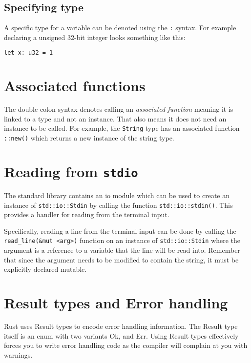 \documentclass[12pt,notitlepage]{article}
\begin{document}
\subsection{Specifying type}

A specific type for a variable can be denoted using the \lstinline{:}
syntax. For example declaring a unsigned 32-bit integer looks something like
this:

\begin{lstlisting}
let x: u32 = 1
\end{lstlisting}



\section{Associated functions}

The double colon syntax denotes calling an \emph{associated function} meaning
it is linked to a type and not an instance. That also means it does not need an
instance to be called. For example, the \lstinline{String} type has an
associated function \lstinline{::new()} which returns a new instance of the
string type.

\section{Reading from \lstinline{stdio}}

The standard library contains an io module which can be used to create an
instance of \lstinline{std::io::Stdin} by calling the function
\lstinline{std::io::stdin()}. This provides a handler for reading from the
terminal input.

Specifically, reading a line from the terminal input can be done by calling the
\lstinline{read_line(&mut <arg>)} function on an instance of
\lstinline{std::io::Stdin} where the argument is a reference to a variable that
the line will be read into. Remember that since the argument needs to be
modified to contain the string, it must be explicitly declared mutable.

\section{Result types and Error handling}

Rust uses Result types to encode error handling information. The Result type
itself is an enum with two variants Ok, and Err. Using Result types effectively
forces you to write error handling code as the compiler will complain at you
with warnings.
\end{document}
